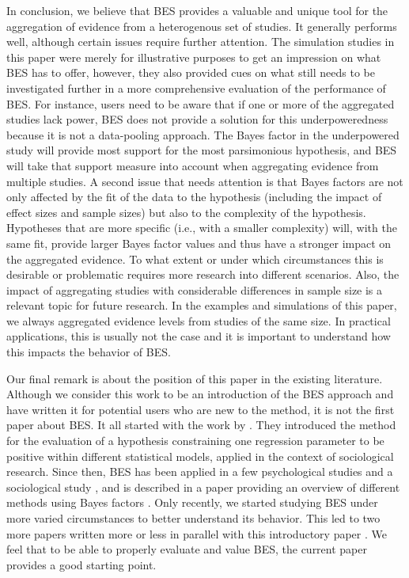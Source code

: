 \documentclass[11pt,reqno]{article}
\begin{document}
In conclusion, we believe that BES provides a valuable and unique tool for the aggregation of evidence from a heterogenous set of studies. It generally performs well, although certain issues require further attention. 
The simulation studies in this paper were merely for illustrative purposes to get an impression on what BES has to offer, however, they also provided cues on what still needs to be investigated further in a more comprehensive evaluation of the performance of BES. For instance, users need to be aware that if one or more of the aggregated studies lack power, BES does not provide a solution for this underpoweredness because it is not a data-pooling approach. The Bayes factor in the underpowered study will provide most support for the most parsimonious hypothesis, and BES will take that support measure into account when aggregating evidence from multiple studies. A second issue that needs attention is that Bayes factors are not only affected by the fit of the data to the hypothesis (including the impact of effect sizes and sample sizes) but also to the complexity of the hypothesis. Hypotheses that are more specific (i.e., with a smaller complexity) will, with the same fit, provide larger Bayes factor values and thus have a stronger impact on the aggregated evidence. To what extent or under which circumstances this is desirable or problematic requires more research into different scenarios. Also, the impact of aggregating studies with considerable differences in sample size is a relevant topic for future research. In the examples and simulations of this paper, we always aggregated evidence levels from studies of the same size. In practical applications, this is usually not the case and it is important to understand how this impacts the behavior of BES.

Our final remark is about the position of this paper in the existing literature. Although we consider this work to be an introduction of the BES approach and have written it for potential users who are new to the method, it is not the first paper about BES. It all started with the work by \textcite{kuiper_combining_2013}. They introduced the method for the evaluation of a hypothesis constraining one regression parameter to be positive within different statistical models, applied in the context of sociological research. Since then, BES has been applied in a few psychological studies \autocite{zondervan_parental_2019, zondervan_robust_2020, kevenaar_bes_2021} and a sociological study \autocite{volker_cooperation_2022}, and is described in a paper providing an overview of different methods using Bayes factors \autocite{heck_review_2022}. Only recently, we started studying BES under more varied circumstances to better understand its behavior. This led to two more papers written more or less in parallel with this introductory paper \autocite[][submitted for publication and available online]{vanwonderen_bes_2022, volker_bes_2022}. We feel that to be able to properly evaluate and value BES, the current paper provides a good starting point.
\end{document}
